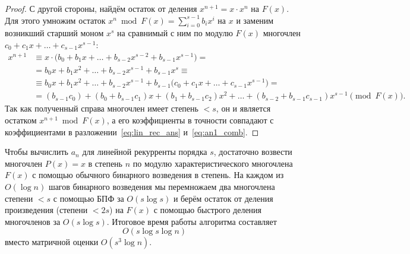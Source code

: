 \begin{proof}
    С другой стороны, найдём остаток от деления $x^{n+1} = x \cdot x^n$ на $F(x)$. Для этого умножим остаток $x^n \bmod F(x) = \sum_{i=0}^{s-1} b_i x^i$ на $x$ и заменим возникший старший моном $x^s$ на сравнимый с ним по модулю $F(x)$ многочлен $c_0 + c_1 x + \dots + c_{s-1} x^{s-1}$:
    \begin{align*}
        x^{n+1} &\equiv x \cdot \bigl(b_0 + b_1 x + \dots + b_{s-2} x^{s-2} + b_{s-1} x^{s-1}\bigr) = \\
        &= b_0 x + b_1 x^2 + \dots + b_{s-2} x^{s-1} + b_{s-1} x^s \equiv \\
        &\equiv b_0 x + b_1 x^2 + \dots + b_{s-2} x^{s-1} + b_{s-1} \bigl(c_0 + c_1 x + \dots + c_{s-1} x^{s-1}\bigr) = \\
        &= (b_{s-1} c_0) + (b_0 + b_{s-1} c_1) x + (b_1 + b_{s-1} c_2) x^2 + \dots + (b_{s-2} + b_{s-1} c_{s-1}) x^{s-1} \pmod{F(x)}.
    \end{align*}
    Так как полученный справа многочлен имеет степень $< s$, он и является остатком $x^{n+1} \bmod F(x)$, а его коэффициенты в точности совпадают с коэффициентами в разложении~\eqref{eq:lin_rec_ans} и~\eqref{eq:an1_comb}.
\end{proof}

\begin{corollary}
    Чтобы вычислить $a_n$ для линейной рекурренты порядка $s$, достаточно возвести многочлен $P(x) = x$ в степень $n$ по модулю характеристического многочлена $F(x)$ с помощью обычного бинарного возведения в степень. На каждом из $O(\log n)$ шагов бинарного возведения мы перемножаем два многочлена степени $< s$ с помощью БПФ за $O(s \log s)$ и берём остаток от деления произведения (степени $< 2s$) на $F(x)$ с помощью быстрого деления многочленов за $O(s \log s)$. Итоговое время работы алгоритма составляет
    \[
        O(s \log s \log n)
    \]
    вместо матричной оценки $O(s^3 \log n)$.
\end{corollary}
